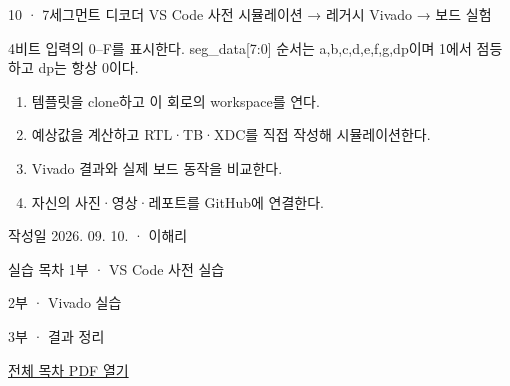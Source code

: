 
\renewcommand{\labonehome}{\hyperlink{legacy-10-contents}{\contentsbutton}}
\renewcommand{\legacySource}[1]{}
\providecommand{\terminalbox}[1]{\par\vspace{0.15cm}{\setlength{\fboxsep}{7pt}\colorbox{black}{\parbox{\dimexpr\textwidth-14pt\relax}{\color{white}\ttfamily\fontsize{7}{9}\selectfont #1}}}\par\vspace{0.15cm}}

\begingroup
\renewcommand{\small}{\fontsize{9}{11}\selectfont}
\begin{frame}{10 · 7세그먼트 디코더}\relax
\small
VS Code 사전 시뮬레이션 → 레거시 Vivado → 보드 실험\par\vspace{0.22cm}4비트 입력의 0–F를 표시한다. seg\_data[7:0] 순서는 a,b,c,d,e,f,g,dp이며 1에서 점등하고 dp는 항상 0이다.\par\begin{enumerate}\setlength{\itemsep}{0.22cm}
\item 템플릿을 clone하고 이 회로의 workspace를 연다.
\item 예상값을 계산하고 RTL·TB·XDC를 직접 작성해 시뮬레이션한다.
\item Vivado 결과와 실제 보드 동작을 비교한다.
\item 자신의 사진·영상·레포트를 GitHub에 연결한다.
\end{enumerate}
작성일 2026. 09. 10. · 이해리\par
\end{frame}

\begin{frame}[label=legacy-10-contents]{실습 목차}\relax
\small
1부 · VS Code 사전 실습\par{}\par\vspace{0.2cm}
\par\vspace{0.4cm}
2부 · Vivado 실습\par{}\par\vspace{0.4cm}
3부 · 결과 정리\par{}\par\vspace{0.35cm}
\href{04.LAB1_00_CONTENTS.pdf}{전체 목차 PDF 열기}
\end{frame}

